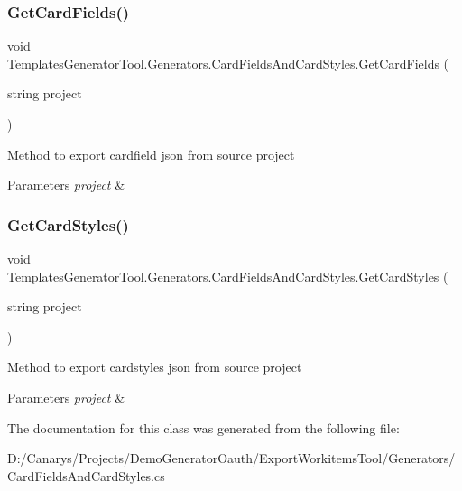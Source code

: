 \subsubsection{\texorpdfstring{Get\+Card\+Fields()}{GetCardFields()}}
{\footnotesize\ttfamily void Templates\+Generator\+Tool.\+Generators.\+Card\+Fields\+And\+Card\+Styles.\+Get\+Card\+Fields (\begin{DoxyParamCaption}\item[{string}]{project }\end{DoxyParamCaption})}



Method to export cardfield json from source project 


\begin{DoxyParams}{Parameters}
{\em project} & \\
\hline
\end{DoxyParams}
\mbox{\label{class_templates_generator_tool_1_1_generators_1_1_card_fields_and_card_styles_a2882c956f1ddc904ab0502fb78a31ca2}} 
\subsubsection{\texorpdfstring{Get\+Card\+Styles()}{GetCardStyles()}}
{\footnotesize\ttfamily void Templates\+Generator\+Tool.\+Generators.\+Card\+Fields\+And\+Card\+Styles.\+Get\+Card\+Styles (\begin{DoxyParamCaption}\item[{string}]{project }\end{DoxyParamCaption})}



Method to export cardstyles json from source project 


\begin{DoxyParams}{Parameters}
{\em project} & \\
\hline
\end{DoxyParams}


The documentation for this class was generated from the following file\+:\begin{DoxyCompactItemize}
\item 
D\+:/\+Canarys/\+Projects/\+Demo\+Generator\+Oauth/\+Export\+Workitems\+Tool/\+Generators/Card\+Fields\+And\+Card\+Styles.\+cs\end{DoxyCompactItemize}
